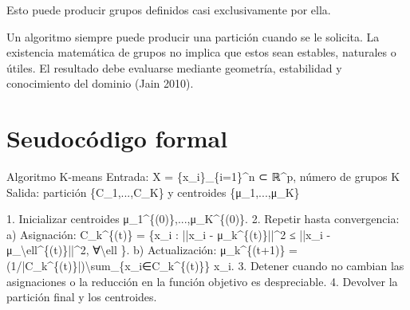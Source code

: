 \documentclass[
  spanish,
  10.5pt,
  letterpaper,
  DIV=11,
  numbers=noendperiod,
  oneside,
  open=any]{scrreprt}
\newenvironment{Shaded}{\begin{snugshade}}{\end{snugshade}}
\newcommand{\NormalTok}[1]{\textcolor[rgb]{0.00,0.23,0.31}{#1}}
\theoremstyle{definition}
\theoremstyle{definition}
\theoremstyle{plain}
\theoremstyle{remark}
\begin{document}
Esto puede producir grupos definidos casi exclusivamente por ella.

\begin{tcolorbox}[enhanced jigsaw, arc=.35mm, bottomrule=.15mm, bottomtitle=1mm, breakable, colback=white, colbacktitle=quarto-callout-warning-color!10!white, colframe=quarto-callout-warning-color-frame, coltitle=black, left=2mm, leftrule=.75mm, opacityback=0, opacitybacktitle=0.6, rightrule=.15mm, title=\textcolor{quarto-callout-warning-color}{\faExclamationTriangle}\hspace{0.5em}{El agrupamiento no descubre automáticamente grupos verdaderos}, titlerule=0mm, toprule=.15mm, toptitle=1mm]

Un algoritmo siempre puede producir una partición cuando se le solicita.
La existencia matemática de grupos no implica que estos sean estables,
naturales o útiles. El resultado debe evaluarse mediante geometría,
estabilidad y conocimiento del dominio (Jain 2010).

\end{tcolorbox}

\section*{Seudocódigo formal}\label{seudocuxf3digo-formal-9}


\begin{tcolorbox}[enhanced jigsaw, arc=.35mm, bottomrule=.15mm, bottomtitle=1mm, breakable, colback=white, colbacktitle=quarto-callout-note-color!10!white, colframe=quarto-callout-note-color-frame, coltitle=black, left=2mm, leftrule=.75mm, opacityback=0, opacitybacktitle=0.6, rightrule=.15mm, title=\textcolor{quarto-callout-note-color}{\faInfo}\hspace{0.5em}{Seudocódigo matemático formal}, titlerule=0mm, toprule=.15mm, toptitle=1mm]

\begin{Shaded}
\begin{Highlighting}[numbers=left,,]
\NormalTok{Algoritmo K{-}means}
\NormalTok{Entrada:}
\NormalTok{  X = \{x\_i\}\_\{i=1\}\^{}n ⊂ ℝ\^{}p, número de grupos K}
\NormalTok{Salida:}
\NormalTok{  partición \{C\_1,...,C\_K\} y centroides \{μ\_1,...,μ\_K\}}

\NormalTok{1. Inicializar centroides μ\_1\^{}\{(0)\},...,μ\_K\^{}\{(0)\}.}
\NormalTok{2. Repetir hasta convergencia:}
\NormalTok{   a) Asignación:}
\NormalTok{         C\_k\^{}\{(t)\} = \{x\_i : ||x\_i {-} μ\_k\^{}\{(t)\}||\^{}2 ≤ ||x\_i {-} μ\_\textbackslash{}ell\^{}\{(t)\}||\^{}2, ∀\textbackslash{}ell \}.}
\NormalTok{   b) Actualización:}
\NormalTok{         μ\_k\^{}\{(t+1)\} = (1/|C\_k\^{}\{(t)\}|)\textbackslash{}sum\_\{x\_i∈C\_k\^{}\{(t)\}\} x\_i.}
\NormalTok{3. Detener cuando no cambian las asignaciones o la reducción en la función objetivo es despreciable.}
\NormalTok{4. Devolver la partición final y los centroides.}
\end{Highlighting}
\end{Shaded}

\end{tcolorbox}
\end{document}
